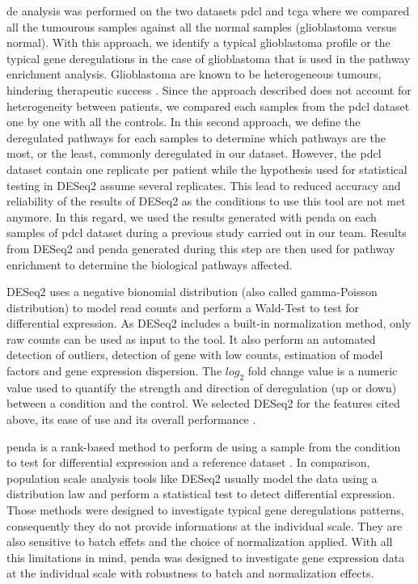 \acrshort{de} analysis was performed on the two datasets \acrshort{pdcl} and \acrshort{tcga} where we compared all the tumourous samples against all the normal samples (glioblastoma versus normal).
With this approach, we identify a typical glioblastoma profile or the typical gene deregulations in the case of glioblastoma that is used in the pathway enrichment analysis.
Glioblastoma are known to be heterogeneous tumours, hindering therapeutic success \cite*{Neftel2019,Delgado-Lopez2016, Quinones2018}.
Since the approach described does not account for heterogeneity between patients, we compared each samples from the \acrshort{pdcl} dataset one by one with all the controls.
In this second approach, we define the deregulated pathways for each samples to determine which pathways are the most, or the least, commonly deregulated in our dataset.
However, the \acrshort{pdcl} dataset contain one replicate per patient while the hypothesis used for statistical testing in DESeq2 assume several replicates.
This lead to reduced accuracy and reliability of the results of DESeq2 as the conditions to use this tool are not met anymore.
In this regard, we used the results generated with \acrshort{penda} on each samples of \acrshort{pdcl} dataset during a previous study carried out in our team.
Results from DESeq2 and \acrshort{penda} generated during this step are then used for pathway enrichment to determine the biological pathways affected.

DESeq2 uses a negative bionomial distribution (also called gamma-Poisson distribution) to model read counts and perform a Wald-Test to test for differential expression.
As DESeq2 includes a built-in normalization method, only raw counts can be used as input to the tool.
It also perform an automated detection of outliers, detection of gene with low counts, estimation of model factors and gene expression dispersion.
The $log_2$ fold change value is a numeric value used to quantify the strength and direction of deregulation (up or down) between a condition and the control.
We selected DESeq2 for the features cited above, its ease of use and its overall performance \cite*{Love2014}.

\acrshort{penda} is a rank-based method to perform \acrshort{de} using a sample from the condition to test for differential expression and a reference dataset \cite*{Richard2020}.
In comparison, population scale analysis tools like DESeq2 usually model the data using a distribution law and perform a statistical test to detect differential expression.
Those methods were designed to investigate typical gene deregulations patterns, consequently they do not provide informations at the individual scale.
They are also sensitive to batch effets and the choice of normalization applied.
With all this limitations in mind, \acrshort{penda} was designed to investigate gene expression data at the individual scale with robustness to batch and normalization effects.

